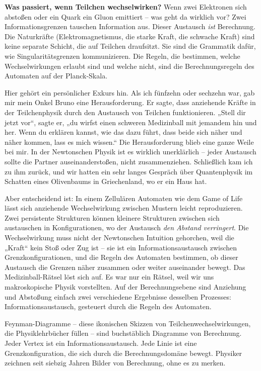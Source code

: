 \documentclass[11pt, twoside, openright]{book}
\begin{document}
\textbf{Was passiert, wenn Teilchen wechselwirken?} Wenn zwei Elektronen sich abstoßen oder ein Quark ein Gluon emittiert -- was geht da wirklich vor? Zwei Informationsgrenzen tauschen Information aus. Dieser Austausch \textit{ist} Berechnung. Die Naturkräfte (Elektromagnetismus, die starke Kraft, die schwache Kraft) sind keine separate Schicht, die auf Teilchen draufsitzt. Sie sind die Grammatik dafür, wie Singularitätsgrenzen kommunizieren. Die Regeln, die bestimmen, welche Wechselwirkungen erlaubt sind und welche nicht, sind die Berechnungsregeln des Automaten auf der Planck-Skala.

Hier gehört ein persönlicher Exkurs hin. Als ich fünfzehn oder sechzehn war, gab mir mein Onkel Bruno eine Herausforderung. Er sagte, dass anziehende Kräfte in der Teilchenphysik durch den Austausch von Teilchen funktionieren. „Stell dir jetzt vor“, sagte er, „du wirfst einen schweren Medizinball mit jemandem hin und her. Wenn du erklären kannst, wie das dazu führt, dass beide sich näher und näher kommen, lass es mich wissen.“ Die Herausforderung blieb eine ganze Weile bei mir. In der Newtonschen Physik ist es wirklich unerklärlich -- jeder Austausch sollte die Partner auseinanderstoßen, nicht zusammenziehen. Schließlich kam ich zu ihm zurück, und wir hatten ein sehr langes Gespräch über Quantenphysik im Schatten eines Olivenbaums in Griechenland, wo er ein Haus hat.

Aber entscheidend ist: In einem Zellulären Automaten wie dem Game of Life lässt sich anziehende Wechselwirkung zwischen Mustern leicht reproduzieren. Zwei persistente Strukturen können kleinere Strukturen zwischen sich austauschen in Konfigurationen, wo der Austausch \textit{den Abstand verringert}. Die Wechselwirkung muss nicht der Newtonschen Intuition gehorchen, weil die „Kraft“ kein Stoß oder Zug ist -- sie ist ein Informationsaustausch zwischen Grenzkonfigurationen, und die Regeln des Automaten bestimmen, ob dieser Austausch die Grenzen näher zusammen oder weiter auseinander bewegt. Das Medizinball-Rätsel löst sich auf. Es war nur ein Rätsel, weil wir uns makroskopische Physik vorstellten. Auf der Berechnungsebene sind Anziehung und Abstoßung einfach zwei verschiedene Ergebnisse desselben Prozesses: Informationsaustausch, gesteuert durch die Regeln des Automaten.

Feynman-Diagramme -- diese ikonischen Skizzen von Teilchenwechselwirkungen, die Physiklehrbücher füllen -- sind buchstäblich Diagramme von Berechnung. Jeder Vertex ist ein Informationsaustausch. Jede Linie ist eine Grenzkonfiguration, die sich durch die Berechnungsdomäne bewegt. Physiker zeichnen seit siebzig Jahren Bilder von Berechnung, ohne es zu merken.
\end{document}
